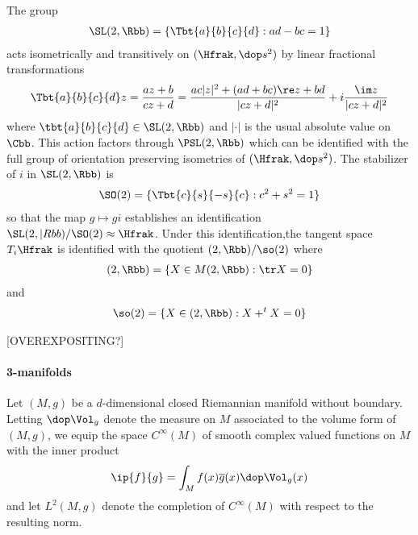 The group
\begin{align*}
    \SL(2,\Rbb) = \left\{ \Tbt{a}{b}{c}{d}: ad-bc =1 \right\}
\end{align*}
acts isometrically and transitively on $(\Hfrak,\dop s^2)$ by linear fractional transformations
\begin{align*}
    \Tbt{a}{b}{c}{d} z = \frac{az+b}{cz+d} = \frac{ac |z|^2 +(ad+bc)\re z  +bd}{|cz+d|^2} + i \frac{\im z}{|cz+d|^2}
\end{align*}
where $\tbt{a}{b}{c}{d} \in \SL(2,\Rbb)$ and $|\cdot|$ is the usual absolute value on $\Cbb$. This action factors through $\PSL(2,\Rbb)$ which can be identified with the full group of orientation preserving isometries of $(\Hfrak,\dop s^2)$. The stabilizer of $i$ in $\SL(2,\Rbb)$ is
\begin{align*}
    \SO(2) = \{\Tbt{c}{s}{-s}{c}: c^2 + s^2 =1\}
\end{align*}
so that the map $g \mapsto g i$ establishes an identification $\SL(2,|Rbb) / \SO(2) \approx \Hfrak$.
Under this identification,the tangent space $T_i \Hfrak$ is identified with the quotient $\sl(2,\Rbb) / \so(2)$ where
\begin{align*}
    \sl(2,\Rbb) = \{ X \in M(2,\Rbb) : \tr X =0 \}
\end{align*}
and
\begin{align*}
    \so(2) = \{ X \in \sl(2,\Rbb) : X + ^t X = 0\}
\end{align*}

[OVEREXPOSITING?]
\paragraph{3-manifolds}



\newpage
Let $(M,g)$ be a $d$-dimensional closed Riemannian manifold without boundary.  Letting $\dop \Vol_g$ denote the measure on $M$ associated to the volume form of $(M,g)$, we equip the space $C^\infty(M)$ of smooth complex valued functions on $M$ with the inner product
\begin{align}\label{eq:ip}
    \ip{f}{g} = \int_M f(x) \overline{g}(x) \dop \Vol_g(x)
\end{align}
and let $L^2(M,g)$ denote the completion of $C^\infty(M)$ with respect to the resulting norm.


